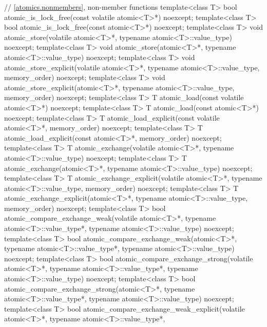 \begin{codeblock}
{  // \ref{atomics.nonmembers}, non-member functions
  template<class T>
    bool atomic_is_lock_free(const volatile atomic<T>*) noexcept;
  template<class T>
    bool atomic_is_lock_free(const atomic<T>*) noexcept;
  template<class T>
    void atomic_store(volatile atomic<T>*, typename atomic<T>::value_type) noexcept;
  template<class T>
    void atomic_store(atomic<T>*, typename atomic<T>::value_type) noexcept;
  template<class T>
    void atomic_store_explicit(volatile atomic<T>*, typename atomic<T>::value_type,
                               memory_order) noexcept;
  template<class T>
    void atomic_store_explicit(atomic<T>*, typename atomic<T>::value_type,
                               memory_order) noexcept;
  template<class T>
    T atomic_load(const volatile atomic<T>*) noexcept;
  template<class T>
    T atomic_load(const atomic<T>*) noexcept;
  template<class T>
    T atomic_load_explicit(const volatile atomic<T>*, memory_order) noexcept;
  template<class T>
    T atomic_load_explicit(const atomic<T>*, memory_order) noexcept;
  template<class T>
    T atomic_exchange(volatile atomic<T>*, typename atomic<T>::value_type) noexcept;
  template<class T>
    T atomic_exchange(atomic<T>*, typename atomic<T>::value_type) noexcept;
  template<class T>
    T atomic_exchange_explicit(volatile atomic<T>*, typename atomic<T>::value_type,
                               memory_order) noexcept;
  template<class T>
    T atomic_exchange_explicit(atomic<T>*, typename atomic<T>::value_type,
                               memory_order) noexcept;
  template<class T>
    bool atomic_compare_exchange_weak(volatile atomic<T>*,
                                      typename atomic<T>::value_type*,
                                      typename atomic<T>::value_type) noexcept;
  template<class T>
    bool atomic_compare_exchange_weak(atomic<T>*,
                                      typename atomic<T>::value_type*,
                                      typename atomic<T>::value_type) noexcept;
  template<class T>
    bool atomic_compare_exchange_strong(volatile atomic<T>*,
                                        typename atomic<T>::value_type*,
                                        typename atomic<T>::value_type) noexcept;
  template<class T>
    bool atomic_compare_exchange_strong(atomic<T>*,
                                        typename atomic<T>::value_type*,
                                        typename atomic<T>::value_type) noexcept;
  template<class T>
    bool atomic_compare_exchange_weak_explicit(volatile atomic<T>*,
                                               typename atomic<T>::value_type*,
}
\end{codeblock}
